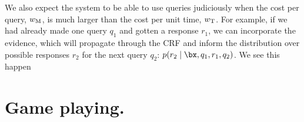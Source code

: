 We also expect the system to be able to use queries judiciously when the cost per query, $w_\text{M}$, is much larger than the cost per unit time, $w_\text{T}$.
For example,
if we had already made one query $q_1$ and gotten a response $r_1$,
we can incorporate the evidence, which will propagate through the CRF
and inform the distribution over possible responses $r_2$ for the next query $q_2$:
$p(r_2 \mid \bx, q_1, r_1, q_2)$.
We see this happen 

%
%

\section{Game playing.}
\label{sec:game-playing}

